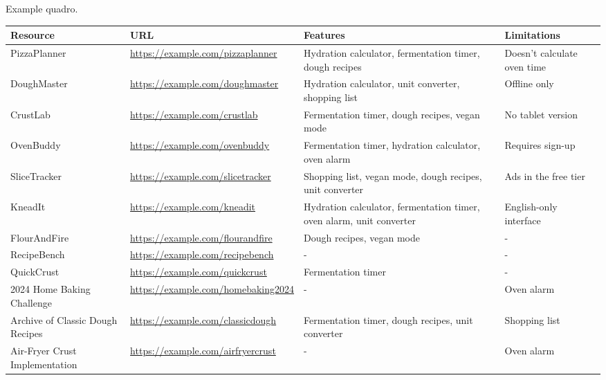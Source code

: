 \begin{landscape}
\begin{quadro}[!htp]
\centering
\caption{Example quadro.}
\label{quad:quadro1}
\scriptsize

\begin{tabular}{|p{2.5cm}|p{5cm}|p{8cm}|p{6cm}|}
\hline
\textbf{Resource} & \textbf{URL} & \textbf{Features} & \textbf{Limitations} \\
\hline
PizzaPlanner & \url{https://example.com/pizzaplanner} & Hydration calculator, fermentation timer, dough recipes & Doesn't calculate oven time \\
\hline
DoughMaster & \url{https://example.com/doughmaster} & Hydration calculator, unit converter, shopping list & Offline only \\
\hline
CrustLab & \url{https://example.com/crustlab} & Fermentation timer, dough recipes, vegan mode & No tablet version \\
\hline
OvenBuddy & \url{https://example.com/ovenbuddy} & Fermentation timer, hydration calculator, oven alarm & Requires sign-up \\
\hline
SliceTracker & \url{https://example.com/slicetracker} & Shopping list, vegan mode, dough recipes, unit converter & Ads in the free tier \\
\hline
KneadIt & \url{https://example.com/kneadit} & Hydration calculator, fermentation timer, oven alarm, unit converter & English-only interface \\
\hline
FlourAndFire & \url{https://example.com/flourandfire} & Dough recipes, vegan mode & - \\
\hline
RecipeBench & \url{https://example.com/recipebench} & - & - \\
\hline
QuickCrust & \url{https://example.com/quickcrust} & Fermentation timer & - \\
\hline
2024 Home Baking Challenge & \url{https://example.com/homebaking2024} & - & Oven alarm \\
\hline
Archive of Classic Dough Recipes & \url{https://example.com/classicdough} & Fermentation timer, dough recipes, unit converter & Shopping list \\
\hline
Air-Fryer Crust Implementation & \url{https://example.com/airfryercrust} & - & Oven alarm \\
\hline
\end{tabular}

\fonteautor
\end{quadro}
\end{landscape}
